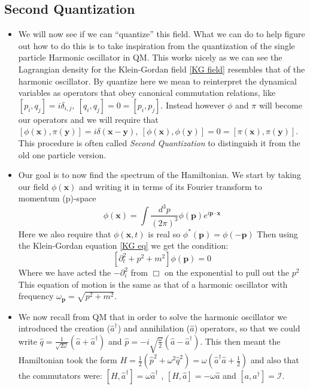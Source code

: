 \documentclass[11pt]{article}
\numberwithin{equation}{section}
\begin{document}
\subsection{Second Quantization}
\begin{itemize}
  \item We will now see if we can ``quantize'' this field. What we can do to help figure out how to do this is to take inspiration from the quantization of the single particle Harmonic oscillator in QM. This works nicely as we can see the Lagrangian density for the Klein-Gordan field \ref{KG field} resembles that of the harmonic oscillator. By quantize here we mean to reinterpret the dynamical variables as operators that obey canonical commutation relations, like $[p_i,q_j] = i\delta_{i,j},~[q_i,q_j] = 0 = [p_i,p_j]$. Instead however $\phi$ and $\pi$ will become our operators and we will require that $[\phi(\textbf{x}),\pi(\textbf{y})] = i \delta(\textbf{x}-\textbf{y}),~ [\phi(\textbf{x}),\phi(\textbf{y})] = 0 = [\pi(\textbf{x}),\pi(\textbf{y})]$. This procedure is often called \emph{Second Quantization} to distinguish it from the old one particle version. 
  
  \item Our goal is to now find the spectrum of the Hamiltonian. We start by taking our field $\phi(\textbf{x})$ and writing it in terms of its Fourier transform to momentum (p)-space
\[
  \phi(\textbf{x}) = \int \frac{d^3p}{(2\pi)^3}\phi(\textbf{p})e^{i\textbf{p}\cdot\textbf{x}}
\]
Here we also require that $\phi(\textbf{x},t)$ is real so $\phi^{\ast}(\textbf{p}) = \phi(-\textbf{p})$ Then using the Klein-Gordan equation \ref{KG eq} we get the condition:
\[
  \left[\partial_t^2 + p^2+m^2\right]\phi(\textbf{p}) = 0 
\]
Where we have acted the $-\partial^2_{i}$ from $\Box$ on the exponential to pull out the $p^2$ This equation of motion is the same as that of a harmonic oscillator with frequency $\omega_{\textbf{p}} = \sqrt{p^2+m^2}$. 

\item We now recall from QM that in order to solve the harmonic oscillator we introduced the creation ($\hat{a}^{\dagger}$) and annihilation ($\hat{a}$) operators, so that we could write $\hat{q} = \frac{1}{\sqrt{2 \omega}}(\hat{a}+\hat{a}^{\dagger})$ and $\hat{p} = -i\sqrt{\frac{\omega}{2}}(\hat{a}-\hat{a}^{\dagger})$. This then meant the Hamiltonian took the form $H = \frac{1}{2}(\hat{p}^2+\omega^2\hat{q}^2) = \omega(\hat{a}^{\dagger}\hat{a}+\frac{1}{2})$ and also that the commutators  were: $[H,\hat{a}^{\dagger}] = \omega \hat{a}^{\dagger}$ , $[H,\hat{a}] = -\omega \hat{a}$ and $[a,a^{\dagger}] =\mathcal{I}$. 
 

\end{itemize}
\end{document}
